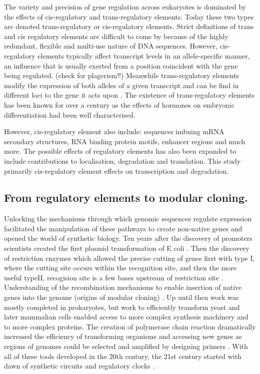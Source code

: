 \documentclass{SBCbookchapter}
\begin{document}
The variety and precision of gene regulation across eukaryotes is dominated by the effects of cis-regulatory and trans-regulatory elements. 
Today these two types are denoted trans-regulatory or cis-regulatory elements. Strict definitions of trans and cis regulatory elements are difficult to come by because of the highly redundant, flexible and multi-use nature of DNA sequences. 
However, cis-regulatory elements typically affect transcript levels in an allele-specific manner, an influence that is usually exerted from a position coincident with the gene being regulated. (check for plagerism!!)
Meanwhile trans-regulatory elements modify the expression of both alleles of a given transcript and can be find in different loci to the gene it acts upon \cite{Skelly2009}. 
The existence of trans-regulatory elements has been known for over a century as the effects of hormones on embryonic differentiation had been well characterised. 

However, cis-regulatory element also include: sequences imbuing mRNA secondary structures, RNA binding protein motifs, enhancer regions and much more. 
The possible effects of regulatory elements has also been expanded to include contributions to localisation, degradation and translation. 
This study primarily cis-regulatory element effects on transcription and degradation.

\subsection{From regulatory elements to modular cloning.}

Unlocking the mechanisms through which genomic sequences regulate expression facilitated the manipulation of these pathways to create non-native genes and opened the world of synthetic biology. 
Ten years after the discovery of promoters scientists created the first plasmid transformation of E coli \cite{Cohen1973}. 
Then the discovery of restriction enzymes which allowed the precise cutting of genes first with type I, where the cutting site occurs within the recognition site, \cite{Arber2003,Meselson1968} and then the more useful typeII, recogision site is a few bases upstream of restriction site \cite{Smith1970,Kelly1970}.
Understanding of the recombination mechanisms to enable insertion of  native genes into the genome (origins of modular cloning) \cite{Jackson1972,Cohen1973}. 
Up until then work was mostly completed in prokaryotes, but work to efficiently transform yeast \cite{Beggs1978} and later mammalian cells \cite{Capecchi1989} enabled access to more complex synthesis machinery and to more complex proteins. 
The creation of polymerase chain reaction dramatically increased the efficiency of transforming organisms and accessing new genes as regions of genomes could be selected and amplified by designing primers \cite{Saiki1988}. 
With all of these tools developed in the 20th century, the 21st century started with dawn of synthetic circuits and regulatory clocks \cite{Elowitz2000,Gardner2000}.
\end{document}
